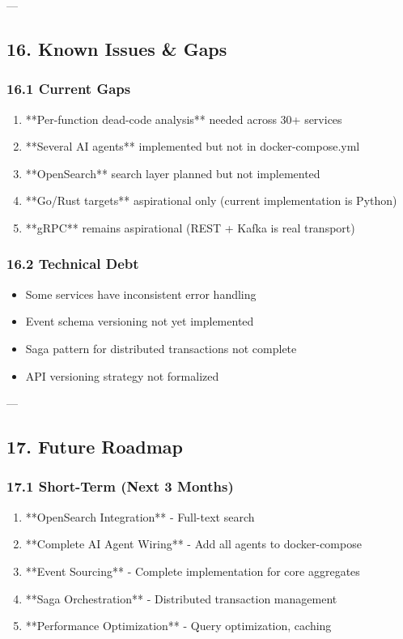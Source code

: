\documentclass[11pt,a4paper]{article}
\begin{document}
---

\subsection{16. Known Issues & Gaps}

\subsubsection{16.1 Current Gaps}

\begin{enumerate}
\item **Per-function dead-code analysis** needed across 30+ services
\item **Several AI agents** implemented but not in docker-compose.yml
\item **OpenSearch** search layer planned but not implemented
\item **Go/Rust targets** aspirational only (current implementation is Python)
\item **gRPC** remains aspirational (REST + Kafka is real transport)
\end{enumerate}

\subsubsection{16.2 Technical Debt}

\begin{itemize}
\item Some services have inconsistent error handling
\item Event schema versioning not yet implemented
\item Saga pattern for distributed transactions not complete
\item API versioning strategy not formalized
\end{itemize}

---

\subsection{17. Future Roadmap}

\subsubsection{17.1 Short-Term (Next 3 Months)}

\begin{enumerate}
\item **OpenSearch Integration** - Full-text search
\item **Complete AI Agent Wiring** - Add all agents to docker-compose
\item **Event Sourcing** - Complete implementation for core aggregates
\item **Saga Orchestration** - Distributed transaction management
\item **Performance Optimization** - Query optimization, caching
\end{enumerate}
\end{document}
